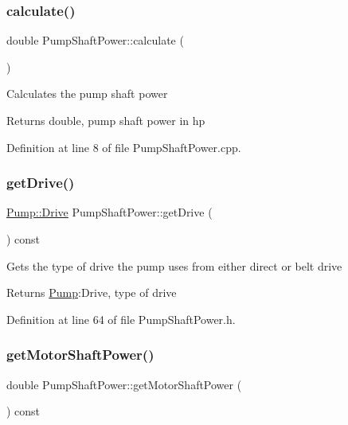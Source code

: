 \subsubsection{\texorpdfstring{calculate()}{calculate()}}
{\footnotesize\ttfamily double Pump\+Shaft\+Power\+::calculate (\begin{DoxyParamCaption}{ }\end{DoxyParamCaption})}

Calculates the pump shaft power

\begin{DoxyReturn}{Returns}
double, pump shaft power in hp 
\end{DoxyReturn}


Definition at line 8 of file Pump\+Shaft\+Power.\+cpp.

\mbox{\label{class_pump_shaft_power_a3d6529d7f5ce8ef194af9abe5e6399b6}} 
\subsubsection{\texorpdfstring{get\+Drive()}{getDrive()}}
{\footnotesize\ttfamily \hyperlink{class_pump_a32bf0ade131a11bb3b3fb374f638e983}{Pump\+::\+Drive} Pump\+Shaft\+Power\+::get\+Drive (\begin{DoxyParamCaption}{ }\end{DoxyParamCaption}) const\hspace{0.3cm}{\ttfamily [inline]}}

Gets the type of drive the pump uses from either direct or belt drive

\begin{DoxyReturn}{Returns}
\hyperlink{class_pump}{Pump}\+:Drive, type of drive 
\end{DoxyReturn}


Definition at line 64 of file Pump\+Shaft\+Power.\+h.

\mbox{\label{class_pump_shaft_power_acb91eadb960f946ffee5373d4839a5be}} 
\subsubsection{\texorpdfstring{get\+Motor\+Shaft\+Power()}{getMotorShaftPower()}}
{\footnotesize\ttfamily double Pump\+Shaft\+Power\+::get\+Motor\+Shaft\+Power (\begin{DoxyParamCaption}{ }\end{DoxyParamCaption}) const\hspace{0.3cm}{\ttfamily [inline]}}

